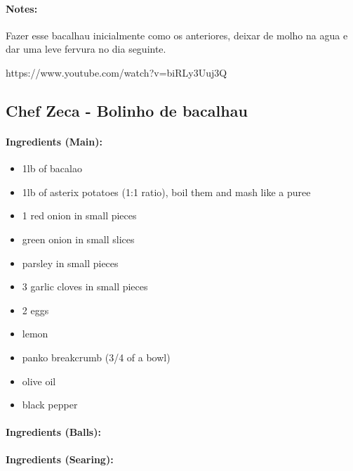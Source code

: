 \documentclass{article}
\begin{document}
\paragraph{Notes:}

Fazer esse bacalhau inicialmente como os anteriores, deixar de molho na agua e dar uma leve fervura no dia seguinte.

https://www.youtube.com/watch?v=biRLy3Uuj3Q

\subsection{Chef Zeca - Bolinho de bacalhau}

\paragraph{Ingredients (Main):}
\begin{itemize}
	\item 1lb of bacalao
	\item 1lb of asterix potatoes (1:1 ratio), boil them and mash like a puree
	\item 1 red onion in small pieces
	\item green onion in small slices
	\item parsley in small pieces
	\item 3 garlic cloves in small pieces
	\item 2 eggs
	\item lemon
	\item panko breakcrumb (3/4 of a bowl)
	\item olive oil
	\item black pepper
\end{itemize}

\paragraph{Ingredients (Balls):}
\begin{itemize}
\end{itemize}

\paragraph{Ingredients (Searing):}
\begin{itemize}
\end{itemize}
\end{document}
